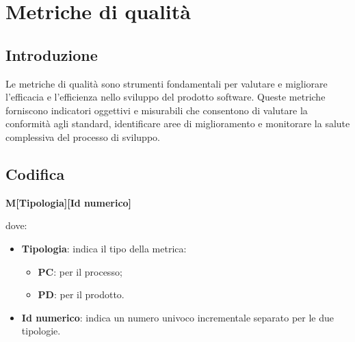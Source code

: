 
\newcommand{\MPC}[2]{
    \refstepcounter{M}
    \subsubsection{MPC\arabic{M} - #1}\label{M:#2}
    }
\newcommand{\MPD}[2]{
    \refstepcounter{M}
    \subsubsection{MPD\arabic{M} - #1}\label{M:#2}
}
\section{Metriche di qualità}
\subsection{Introduzione}
Le metriche di qualità sono strumenti fondamentali per
valutare e migliorare l’efficacia e l’efficienza nello sviluppo del prodotto software. Queste metriche
forniscono indicatori oggettivi e misurabili che consentono di valutare la conformità agli
standard, identificare aree di miglioramento e monitorare la salute complessiva del processo
di sviluppo.
\subsection*{Codifica}
\begin{center}
    \textbf{M[Tipologia][Id numerico]}
\end{center}
dove:
\begin{itemize}
    \item \textbf{Tipologia}: indica il tipo della metrica:
    \begin{itemize}
        \item \textbf{PC}: per il processo;
        \item \textbf{PD}: per il prodotto.
    \end{itemize}
    \item \textbf{Id numerico}: indica un numero univoco incrementale separato per le due tipologie.
\end{itemize}


